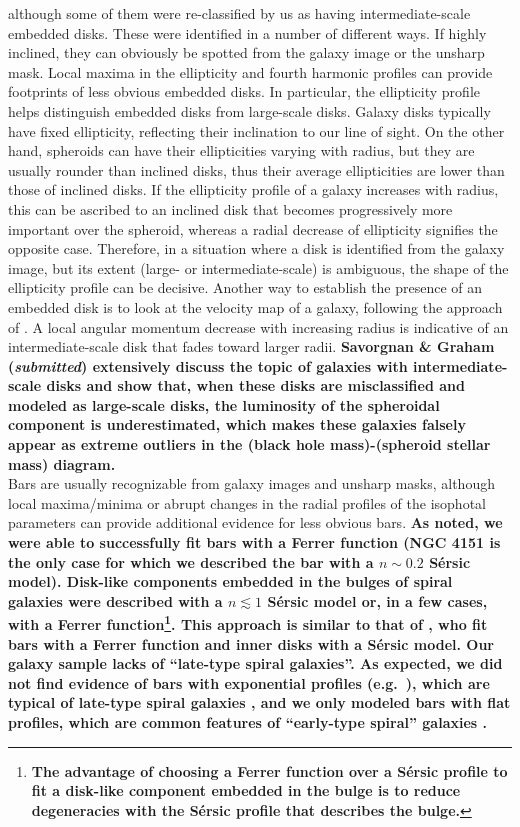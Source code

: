 \documentclass[preprint2]{emulateapj}
\begin{document}
although some of them were re-classified by us as having intermediate-scale embedded disks.
These were identified in a number of different ways. 
If highly inclined, they can obviously be spotted from the galaxy image or the unsharp mask.
Local maxima in the ellipticity and fourth harmonic profiles 
can provide footprints of less obvious embedded disks.
In particular, the ellipticity profile helps distinguish embedded disks from large-scale disks.
Galaxy disks typically have fixed ellipticity, reflecting their inclination to our line of sight.
On the other hand, spheroids can have their ellipticities varying with radius,
but they are usually rounder than inclined disks, thus their average ellipticities are lower than those of inclined disks.
If the ellipticity profile of a galaxy increases with radius, 
this can be ascribed to an inclined disk that becomes progressively more important over the spheroid,
whereas a radial decrease of ellipticity signifies the opposite case.
Therefore, in a situation where a disk is identified from the galaxy image, 
but its extent (large- or intermediate-scale) is ambiguous,
the shape of the ellipticity profile can be decisive. 
Another way to establish the presence of an embedded disk is to look at the velocity map of a galaxy,
following the approach of \citet{arnold2014}. 
A local angular momentum decrease with increasing radius is indicative of an intermediate-scale disk 
that fades toward larger radii. 
{\bf Savorgnan \& Graham (\emph{submitted}) extensively discuss the topic of galaxies with intermediate-scale disks 
and show that, when these disks are misclassified and modeled as large-scale disks, 
the luminosity of the spheroidal component is underestimated, 
which makes these galaxies falsely appear as extreme outliers in the (black hole mass)-(spheroid stellar mass) diagram. } \\
Bars are usually recognizable from galaxy images and unsharp masks, 
although local maxima/minima or abrupt changes in the radial profiles of the isophotal parameters 
can provide additional evidence for less obvious bars. 
{\bf As noted, we were able to successfully fit bars with a Ferrer function 
(NGC 4151 is the only case for which we described the bar with a $n \sim 0.2$ S\'ersic model). 
Disk-like components embedded in the bulges of spiral galaxies were described with a $n \lesssim 1$ S\'ersic model or, 
in a few cases, with a Ferrer function\footnote{\bf The advantage of choosing a Ferrer function over a S\'ersic profile 
to fit a disk-like component embedded in the bulge 
is to reduce degeneracies with the S\'ersic profile that describes the bulge.}. 
This approach is similar to that of \cite{laurikainen2010}, 
who fit bars with a Ferrer function and inner disks with a S\'ersic model. 
Our galaxy sample lacks of ``late-type spiral galaxies''.
As expected, we did not find evidence of bars with exponential profiles (e.g.~\citealt{elmegreenelmegreen1985,gadotti2008,kim2015}), 
which are typical of late-type spiral galaxies \citep{gadottidesouza2006}, 
and we only modeled bars with flat profiles, which are common features of ``early-type spiral'' galaxies \citep{gadottidesouza2006}. }\\
\end{document}
